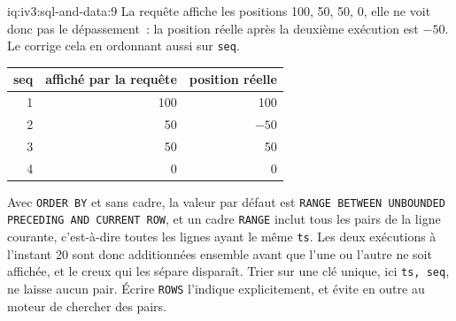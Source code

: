 \begin{solution}{iq:iv3:sql-and-data:9}
La requête affiche les positions 100, 50, 50, 0, elle ne voit donc pas le dépassement~: la position réelle après la deuxième exécution est $-50$. Le  corrige cela en ordonnant aussi sur \texttt{seq}.
\enlargethispage{-3\baselineskip}%
\label{lst:iv3:sq:posfixed}
\begin{center}\small
\begin{tabular}{rrr}
seq & affiché par la requête & position réelle\\\hline
1 & 100 & 100\\
2 & 50 & $-50$\\
3 & 50 & 50\\
4 & 0 & 0
\end{tabular}
\end{center}
Avec \texttt{ORDER BY} et sans cadre, la valeur par défaut est \texttt{RANGE BETWEEN UNBOUNDED PRECEDING AND CURRENT ROW}, et un cadre \texttt{RANGE} inclut tous les pairs de la ligne courante, c'est-à-dire toutes les lignes ayant le même \texttt{ts}. Les deux exécutions à l'instant 20 sont donc additionnées ensemble avant que l'une ou l'autre ne soit affichée, et le creux qui les sépare disparaît. Trier sur une clé unique, ici \texttt{ts, seq}, ne laisse aucun pair. Écrire \texttt{ROWS} l'indique explicitement, et évite en outre au moteur de chercher des pairs.

\end{solution}

